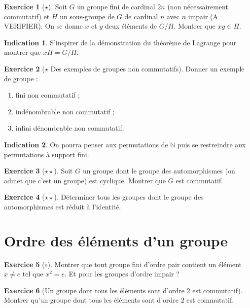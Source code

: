 \documentclass[french]{book}
\newcommand{\N}{\mathbb{N}}
\theoremstyle{definition}
\newtheorem{ex}{Exercice}[chapter]
\theoremstyle{theorem}
\newtheorem*{ind}{Indication}
\theoremstyle{remark}
\begin{document}
\begin{ex}[$\star$]
	Soit $G$ un groupe fini de cardinal $2n$ (non nécessairement commutatif) et $H$ un sous-groupe de $G$ de cardinal $n$ avec $n$ impair (A VERIFIER). On se donne $x$ et $y$ deux éléments de $G/H$. Montrer que $xy\in H$.
\end{ex}

\begin{ind}
	S'inspirer de la démonstration du théorème de Lagrange pour montrer que $xH=G/H$.
\end{ind}

\begin{ex}[$\star$ Des exemples de groupes non commutatifs]
	Donner un exemple de groupe : 
	\begin{enumerate}
		\item fini non commutatif ;
		\item indénombrable non commutatif ;
		\item infini dénombrable non commutatif.
	\end{enumerate}
\end{ex}

\begin{ind}
	On pourra penser aux permutations de $\N$ puis se restreindre aux permutations à support fini.
\end{ind}

\begin{ex}[$\star\star$]
	Soit $G$ un groupe dont le groupe des automorphismes (on admet que c'est un groupe) est cyclique. Montrer que $G$ est commutatif.
\end{ex}

\begin{ex}[$\star\star$]
	Déterminer tous les groupes dont le groupe des automorphismes est réduit à l'identité.
\end{ex}

\section{Ordre des éléments d'un groupe}

\begin{ex}[$\circ$]
	Montrer que tout groupe fini d'ordre pair contient un élément $x\ne e$ tel que $x^2=e$. Et pour les groupes d'ordre impair ?
\end{ex}

\begin{ex}[Un groupe dont tous les éléments sont d'ordre $2$ est commutatif]
	Montrer qu'un groupe dont tous les éléments sont d'ordre $2$ est commutatif.
\end{ex}
\end{document}
